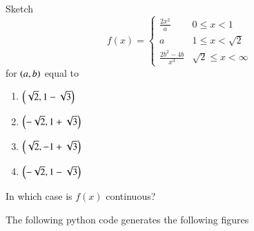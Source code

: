 \documentclass[journal,12pt,twocolumn]{IEEEtran}
\begin{document}
\begin{problem}
Sketch 
\begin{equation*}
f(x) = 
\begin{cases}
\frac{2x^2}{a} & 0 \leq x < 1\\
a & 1 \leq x < \sqrt{2} \\
\frac{2b^2 - 4b}{x^3} & \sqrt{2} \leq x < \infty
\end{cases}
\end{equation*}
for $\left(a,b\right)$ equal to 
\begin{enumerate}
\item $\left(\sqrt{2}, 1 - \sqrt{3}\right)$
\item $\left(-\sqrt{2}, 1 + \sqrt{3}\right)$
\item $\left(\sqrt{2},-1+\sqrt{3}\right)$
\item $\left(-\sqrt{2}, 1 - \sqrt{3}\right)$
\end{enumerate}
In which case is  $f(x)$ continuous?
\end{problem}
%
\solution The following python code generates the following figures

\end{document}
